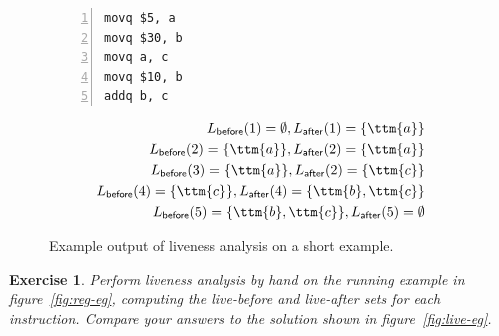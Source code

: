 \documentclass[7x10]{TimesAPriori_MIT}%
\newtheorem{exercise}[theorem]{Exercise}
\numberwithin{theorem}{chapter}
\numberwithin{definition}{chapter}
\numberwithin{equation}{chapter}
\begin{document}
\begin{figure}[tbp]
  \centering
  \begin{tcolorbox}[colback=white]
    \hspace{10pt}
  \begin{minipage}{0.4\textwidth}
\begin{lstlisting}[numbers=left,numberstyle=\tiny]
movq $5, a
movq $30, b
movq a, c
movq $10, b
addq b, c
\end{lstlisting}
\end{minipage}
\vrule\hspace{10pt}
\begin{minipage}{0.45\textwidth}
\begin{align*}
L_{\mathsf{before}}(1)=  \emptyset, 
L_{\mathsf{after}}(1)=  \{\ttm{a}\}\\
L_{\mathsf{before}}(2)=  \{\ttm{a}\},
L_{\mathsf{after}}(2)=  \{\ttm{a}\}\\
L_{\mathsf{before}}(3)=  \{\ttm{a}\},
L_{\mathsf{after}}(2)=  \{\ttm{c}\}\\
L_{\mathsf{before}}(4)=  \{\ttm{c}\},
L_{\mathsf{after}}(4)=  \{\ttm{b},\ttm{c}\}\\
L_{\mathsf{before}}(5)=  \{\ttm{b},\ttm{c}\},
L_{\mathsf{after}}(5)=  \emptyset
\end{align*}
\end{minipage}
\end{tcolorbox}
\caption{Example output of liveness analysis on a short example.}
\label{fig:liveness-example-0}
\end{figure}

\begin{exercise}\normalfont\normalsize
  Perform liveness analysis by hand on the running example in
  figure~\ref{fig:reg-eg}, computing the live-before and live-after
  sets for each instruction. Compare your answers to the solution
  shown in figure~\ref{fig:live-eg}.
\end{exercise}
\end{document}
